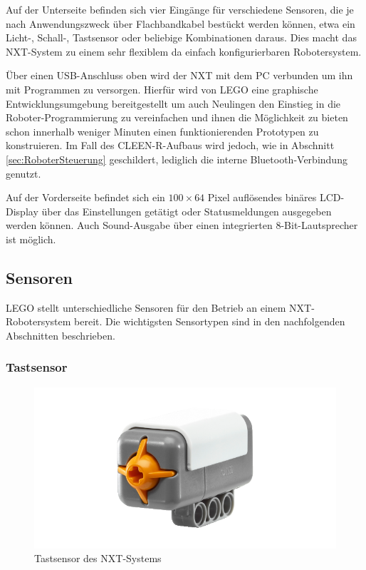 Auf der Unterseite befinden sich vier Eingänge für verschiedene Sensoren, die je nach Anwendungszweck über Flachbandkabel bestückt werden können, etwa ein Licht-, Schall-, Tastsensor oder beliebige Kombinationen daraus. Dies macht das NXT-System zu einem sehr flexiblem da einfach konfigurierbaren Robotersystem.

Über einen USB-Anschluss oben wird der NXT mit dem PC verbunden um ihn mit Programmen zu versorgen. Hierfür wird von LEGO eine graphische Entwicklungsumgebung bereitgestellt um auch Neulingen den Einstieg in die Roboter-Programmierung zu vereinfachen und ihnen die Möglichkeit zu bieten schon innerhalb weniger Minuten einen funktionierenden Prototypen zu konstruieren. Im Fall des CLEEN-R-Aufbaus wird jedoch, wie in Abschnitt \ref{sec:RoboterSteuerung} geschildert, lediglich die interne Bluetooth-Verbindung genutzt.

Auf der Vorderseite befindet sich ein $100\times 64$ Pixel auflösendes binäres LCD-Display über das Einstellungen getätigt oder Statusmeldungen ausgegeben werden können. Auch Sound-Ausgabe über einen integrierten 8-Bit-Lautsprecher ist möglich.

\subsection{Sensoren}

LEGO stellt unterschiedliche Sensoren für den Betrieb an einem NXT-Robotersystem bereit. Die wichtigsten Sensortypen sind in den nachfolgenden Abschnitten beschrieben.

\subsubsection{Tastsensor}

\begin{figure}[h]
\centering
\includegraphics[width=\textwidth/3]{Bilder/Robot/button_sensor}
\caption{Tastsensor des NXT-Systems}
\label{fig:buttonSensor}
\end{figure}

